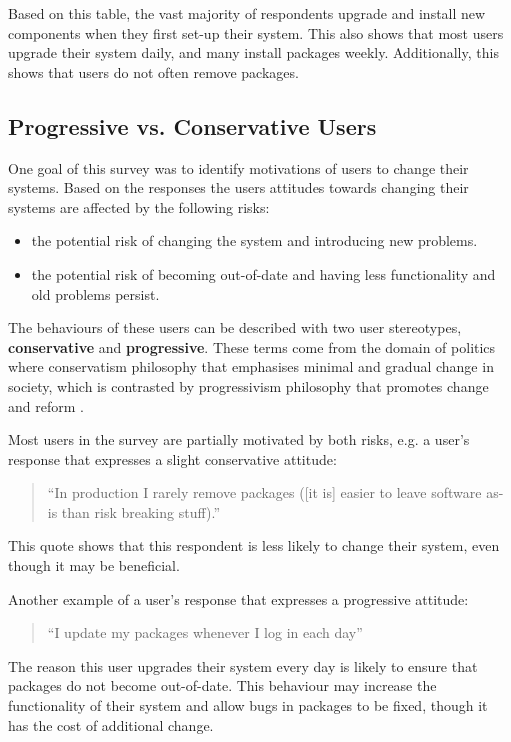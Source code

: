 Based on this table, the vast majority of respondents upgrade and install new components when they first set-up their system.
This also shows that most users upgrade their system daily, and many install packages weekly.
Additionally, this shows that users do not often remove packages. 

\subsection{Progressive vs. Conservative Users}
One goal of this survey was to identify motivations of users to change their systems.
Based on the responses the users attitudes towards changing their systems are affected by the following risks:
\begin{itemize}
  \item the potential risk of changing the system and introducing new problems.
  \item the potential risk of becoming out-of-date and having less functionality and old problems persist.
\end{itemize}
The behaviours of these users can be described with two user stereotypes, \textbf{conservative} and \textbf{progressive}.
These terms come from the domain of politics where conservatism philosophy that emphasises minimal and gradual change in society,
which is contrasted by progressivism philosophy that promotes change and reform \citep{oed2010}.

Most users in the survey are partially motivated by both risks, e.g. a user's response that expresses a slight conservative attitude:
\begin{quotation}
``In production I rarely remove packages ([it is] easier to leave software as-is than risk breaking stuff).''
\end{quotation}
This quote shows that this respondent is less likely to change their system, even though it may be beneficial. 

Another example of a user's response that expresses a progressive attitude:
\begin{quotation}
``I update my packages whenever I log in each day''
\end{quotation}
The reason this user upgrades their system every day is likely to ensure that packages do not become out-of-date.
This behaviour may increase the functionality of their system and allow bugs in packages to be fixed, though it has the cost of additional change.

